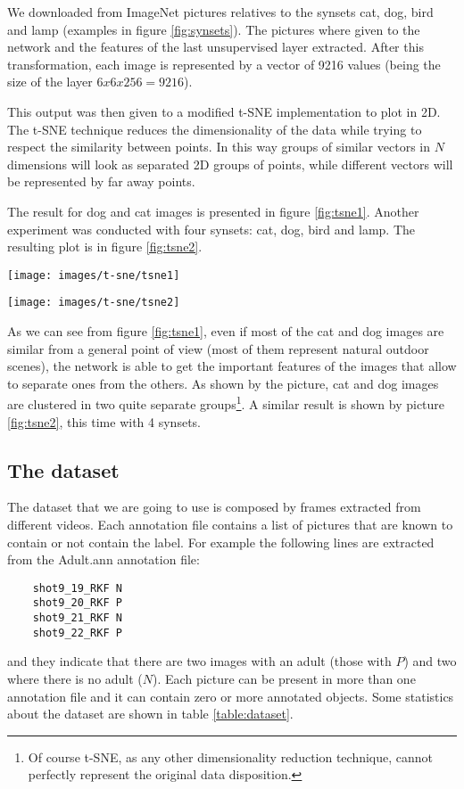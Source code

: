 We downloaded from ImageNet pictures relatives to the synsets cat, dog, bird and
lamp (examples in figure \ref{fig:synsets}). The pictures where given to the network
and the features of the last unsupervised layer extracted. After this
transformation, each image is represented by a vector of 9216 values (being the
size of the layer $6x6x256=9216$). 

This output was then given to a modified t-SNE implementation to plot in 2D. The
t-SNE technique reduces the dimensionality of the data while trying to respect
the similarity between points. In this way groups of similar vectors in $N$
dimensions will look as separated 2D groups of points, while different vectors
will be represented by far away points.  

The result for dog and cat images is presented in figure \ref{fig:tsne1}.
Another experiment was conducted with four synsets: cat, dog, bird and lamp. The
resulting plot is in figure \ref{fig:tsne2}.

\begin{figure*}[hbtp]
    \centering
    \texttt{[image: images/t-sne/tsne1]}
    \caption{t-SNE representation of layer 5 output (2 synsets)}
    \label{fig:tsne1}
\end{figure*}
\begin{figure*}[hbtp]
    \centering
    \texttt{[image: images/t-sne/tsne2]}
    \caption{t-SNE representation of layer 5 output (4 synsets)}
    \label{fig:tsne2}
\end{figure*}

As we can see from figure \ref{fig:tsne1}, even if most of the cat and dog
images are similar from a general point of view (most of them represent natural
outdoor scenes), the network is able to get the important features of the images
that allow to separate ones from the others. As shown by the picture, cat and
dog images are clustered in two quite separate groups\footnote{Of course t-SNE,
as any other dimensionality reduction technique, cannot perfectly represent the
original data disposition.}. A similar result is shown by picture
\ref{fig:tsne2}, this time with 4 synsets.

\subsection{The dataset}

The dataset that we are going to use is composed by frames extracted from
different videos. Each annotation file contains a list of pictures that are
known to contain or not contain the label. For example the following lines are
extracted from the Adult.ann annotation file:
\begin{verbatim}
    shot9_19_RKF N
    shot9_20_RKF P
    shot9_21_RKF N
    shot9_22_RKF P
\end{verbatim}
and they indicate that there are two images with an adult (those with $P$) and
two where there is no adult ($N$). Each picture can be present in more than one
annotation file and it can contain zero or more annotated objects. Some
statistics about the dataset are shown in table \ref{table:dataset}.

